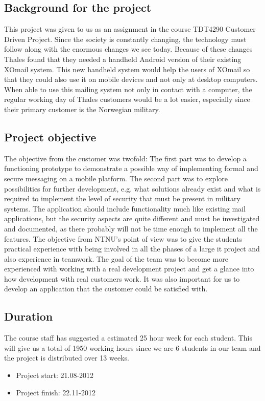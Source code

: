 \subsection{Background for the project}
This project was given to us as an assignment in the course TDT4290 Customer Driven Project. Since the society is constantly changing, the technology must follow along with the enormous changes we see today. Because of these changes Thales found that they needed a handheld Android version of their existing XOmail system. This new handheld system would help the users of XOmail so that they could also use it on mobile devices and not only at desktop computers. When able to use this mailing system not only in contact with a computer, the regular working day of Thales customers would be a lot easier, especially since their primary customer is the Norwegian military.

\newpage

\subsection{Project objective}
The objective from the customer was twofold: The first part was to develop a functioning prototype to demonstrate a possible way of implementing formal and secure messaging on a mobile platform. The second part was to explore possibilities for further development, e.g. what solutions already exist and what is required to implement the level of security that must be present in military systems. The application should include functionality much like existing mail applications, but the security aspects are quite different and must be investigated and documented, as there probably will not be time enough to implement all the features.
\newline
\newline
The objective from NTNU’s point of view was to give the students practical experience with being involved in all the phases of a large \gls{it} project and also experience in teamwork. 
\newline
\newline
The goal of the team was to become more experienced with working with a real development project and get a glance into how development with real customers work. It was also important for us to develop an application that the customer could be satisfied with. 


\subsection{Duration}
The course staff has suggested a estimated 25 hour week for each student. This will give us a total of 1950 working hours since we are 6 students in our team and the project is distributed over 13 weeks.

\begin{itemize}
\item{}Project start: 21.08-2012
\item{}Project finish: 22.11-2012
\end{itemize}

